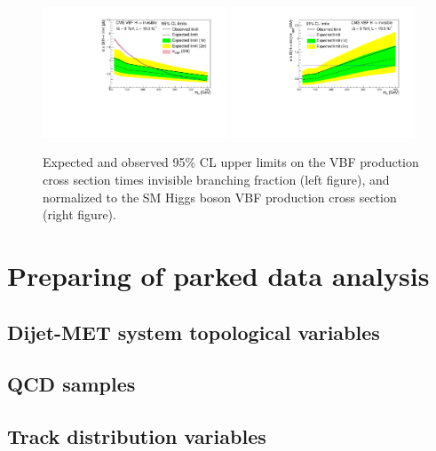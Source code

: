 \begin{figure}[!htp]
\centering
\includegraphics[width=0.49\textwidth]{Chapter05/Images/vbfxslimit.pdf}
\includegraphics[width=0.49\textwidth]{Chapter05/Images/vbflimit.pdf}
\caption{Expected and observed 95\% CL upper limits on the VBF production cross section times invisible branching fraction (left figure), and normalized to the \gls{SM} Higgs boson \gls{VBF} production cross section (right figure). \cite{ARTICLE:CMSVBFHiggsToInvAndZHCombination}}
\label{FIGURE:PromptDataAnalysis_VBFLimit}
\end{figure}

\section{Preparing of parked data analysis}

\subsection{Dijet-MET system topological variables}

\subsection{QCD samples}

\subsection{Track distribution variables}



